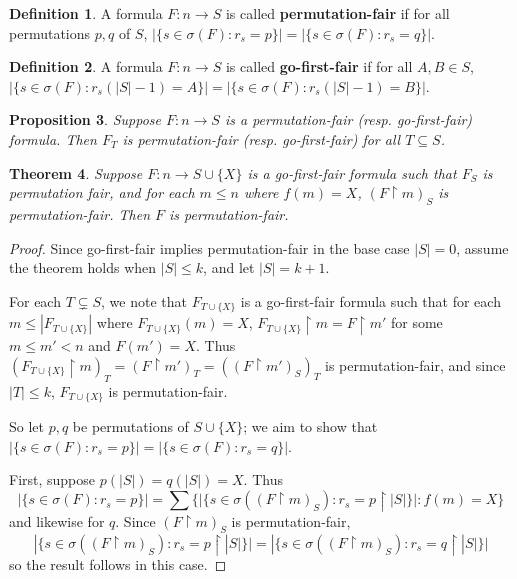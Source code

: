 \documentclass{article}
\newtheorem{theorem}{Theorem}
\newtheorem{proposition}[theorem]{Proposition}
\theoremstyle{definition}
\newtheorem{definition}[theorem]{Definition}
\newcommand{\rest}{\upharpoonright}
\newcommand{\term}{\textbf}
\begin{document}
\begin{definition}
    A formula \(F:n\to S\) is called \term{permutation-fair} if
    for all permutations \(p,q\) of \(S\),
    \(|\{s\in\sigma (F):r_s=p\}|=|\{s\in\sigma (F):r_s=q\}|\). 
\end{definition}

\begin{definition}
    A formula \(F:n\to S\) is called \term{go-first-fair} if
    for all \(A,B\in S\),
    \(|\{s\in\sigma (F):r_s(|S|-1)=A\}|=|\{s\in\sigma (F):r_s(|S|-1)=B\}|\). 
\end{definition}

\begin{proposition}
    Suppose \(F:n\to S\) is a permutation-fair (resp. go-first-fair)
    formula. Then \(F_T\) is permutation-fair (resp. go-first-fair)
    for all \(T\subseteq S\).
\end{proposition}

\begin{theorem}
    Suppose \(F:n\to S\cup\{X\}\) is a go-first-fair formula such that 
    \(F_S\) is permutation fair, and for each \(m\leq n\) where \(f(m)=X\), 
    \((F\rest m)_S\) is permutation-fair.
    Then \(F\) is permutation-fair.
\end{theorem}

\begin{proof}
    Since go-first-fair implies permutation-fair in the base case \(|S|=0\),
    assume the theorem holds when \(|S|\leq k\), and let \(|S|=k+1\).
    
    For each \(T\subsetneq S\), we note that \(F_{T\cup\{X\}}\) is a go-first-fair 
    formula such that for each \(m\leq|F_{T\cup\{X\}}|\) where \(F_{T\cup\{X\}}(m)=X\), 
    \(F_{T\cup\{X\}}\rest m=F\rest m'\) for some \(m\leq m'< n\) and
    \(F(m')=X\). Thus \((F_{T\cup\{X\}}\rest m)_T=(F\rest m')_T=((F\rest m')_S)_T\)
    is permutation-fair, and since \(|T|\leq k\), \(F_{T\cup\{X\}}\) is permutation-fair.

    So let \(p,q\) be permutations of \(S\cup\{X\}\); we aim to show that
    \(|\{s\in\sigma (F):r_s=p\}|=|\{s\in\sigma (F):r_s=q\}|\). 
    
    First, suppose \(p(|S|)=q(|S|)=X\). Thus 
    \[
        |\{s\in\sigma (F):r_s=p\}|
    =
        \sum\Big\{\Big|\{s\in\sigma ((F\rest m)_S):r_s=p\rest|S|\}\Big|:f(m)=X\Big\}
    \] 
    and likewise for \(q\). Since \((F\rest m)_S\) is permutation-fair,
    \[
        |\{s\in\sigma ((F\rest m)_S):r_s=p\rest|S|\}|
    =
        |\{s\in\sigma ((F\rest m)_S):r_s=q\rest|S|\}|
    \]
    so the result follows in this case.


\end{proof}
\end{document}
